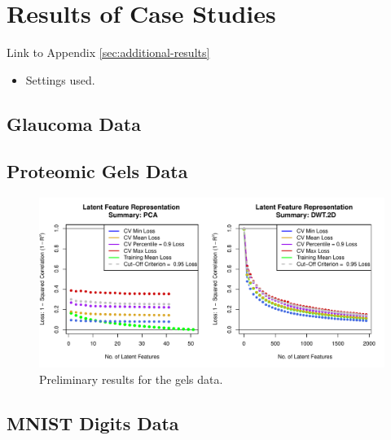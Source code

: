 \section{Results of Case Studies}\label{sec:results}

Link to Appendix \ref{sec:additional-results}
\begin{itemize}
    \item Settings used.
\end{itemize}

\subsection{Glaucoma Data}
\subsection{Proteomic Gels Data}

\begin{figure}
    \centering
    \includegraphics[width=1\linewidth]{figures/initial-gels.pdf}
    \caption{Preliminary results for the gels data.}
    \label{fig:enter-label}
\end{figure}
\subsection{MNIST Digits Data}